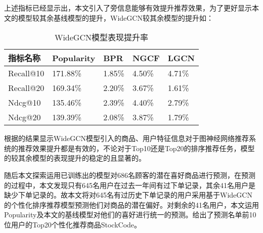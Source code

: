 \documentclass[lang=cn,11pt,a4paper,cite=authoryear]{elegantpaper}
\begin{document}
  上述指标已经显示出，本文引入了旁信息能够有效提升推荐效果，为了更好显示本文的模型较其余基线模型的提升，WideGCN较其余模型的提升如：
  \begin{table}[!htb]
    \centering
    \caption{WideGCN模型表现提升率}
      \huge
      \begin{tabular}{C{2cm}|C{1.5cm}|C{1.5cm}|C{1.5cm}|C{1.5cm}}
      \hline
      \textbf{指标名称} & \textbf{Popularity} & \textbf{BPR} & \textbf{NGCF} & \textbf{LGCN} \\
      \hline
      Recall@10 & 171.88\% & 1.85\% & 4.50\% & 4.71\% \\
      Recall@20 & 169.34\% & 2.20\% & 3.67\% & 1.61\% \\
      Ndcg@10 & 135.46\% & 2.39\% & 4.40\% & 2.79\% \\
      Ndcg@20 & 139.39\% & 2.08\% & 3.87\% & 1.79\% \\
      \hline
      \end{tabular}
    \label{WGCN提升表}
  \end{table}

  根据的结果显示WideGCN模型引入的商品、用户特征信息对于图神经网络推荐系统的推荐效果提升都是有效的，不论对于Top10还是Top20的排序推荐任务，模型的较其余模型的表现提升的稳定的且显著的。

  随后本文探索运用已训练出的模型对686名顾客的潜在喜好商品进行预测，在预测的过程中，本文发现只有645名用户在过去一年间有过下单记录，其余41名用户是缺少下单记录的。故本文将对645名有过历史下单记录的用户采用基于WideGCN的个性化排序推荐模型预测他们对商品的潜在偏好。对剩余的41名用户，本文运用Popularity及本文的基线模型对他们的喜好进行统一的预测。给出了预测名单前10位用户的Top20个性化推荐商品StockCode。
\end{document}
